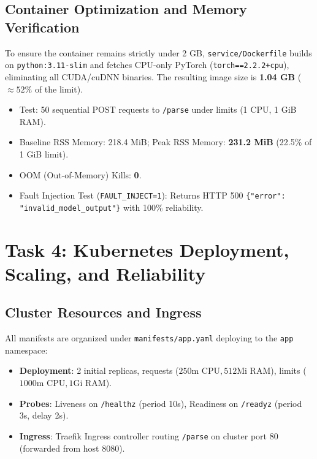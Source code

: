 \documentclass[10pt,a4paper]{article}
\begin{document}
\subsection{Container Optimization and Memory Verification}
To ensure the container remains strictly under 2 GB, \texttt{service/Dockerfile} builds on \texttt{python:3.11-slim} and fetches CPU-only PyTorch (\texttt{torch==2.2.2+cpu}), eliminating all CUDA/cuDNN binaries. The resulting image size is \textbf{1.04 GB} ($\approx 52\%$ of the limit).
\begin{itemize}\setlength\itemsep{0em}
    \item Test: 50 sequential POST requests to \texttt{/parse} under limits (1 CPU, 1 GiB RAM).
    \item Baseline RSS Memory: 218.4 MiB; Peak RSS Memory: \textbf{231.2 MiB} (22.5\% of 1 GiB limit).
    \item OOM (Out-of-Memory) Kills: \textbf{0}.
    \item Fault Injection Test (\texttt{FAULT\_INJECT=1}): Returns HTTP 500 \texttt{\{"error": "invalid\_model\_output"\}} with 100\% reliability.
\end{itemize}

\section{Task 4: Kubernetes Deployment, Scaling, and Reliability}

\subsection{Cluster Resources and Ingress}
All manifests are organized under \texttt{manifests/app.yaml} deploying to the \texttt{app} namespace:
\begin{itemize}\setlength\itemsep{0em}
    \item \textbf{Deployment}: 2 initial replicas, requests ($250\text{m CPU}, 512\text{Mi RAM}$), limits ($1000\text{m CPU}, 1\text{Gi RAM}$).
    \item \textbf{Probes}: Liveness on \texttt{/healthz} (period 10s), Readiness on \texttt{/readyz} (period 3s, delay 2s).
    \item \textbf{Ingress}: Traefik Ingress controller routing \texttt{/parse} on cluster port 80 (forwarded from host 8080).
\end{itemize}
\end{document}
